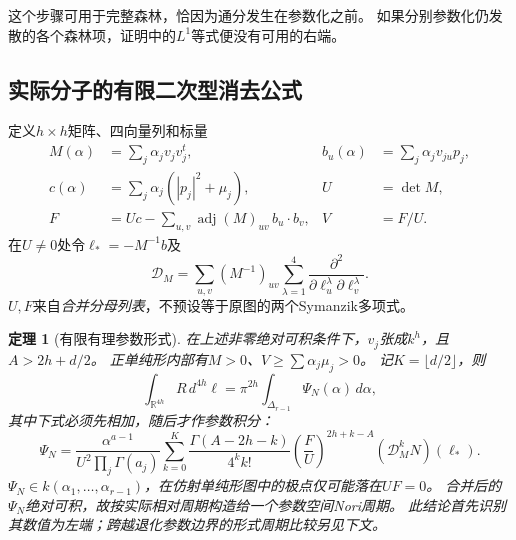 \documentclass[11pt,a4paper]{ctexart}
\theoremstyle{cnplain}\newtheorem{theorem}{定理}[section]
\theoremstyle{definition}\newtheorem{definition}[theorem]{定义}
\theoremstyle{remark}\newtheorem{remark}[theorem]{注}
\begin{document}
这个步骤可用于完整森林，恰因为通分发生在参数化之前。
如果分别参数化仍发散的各个森林项，证明中的$L^1$等式便没有可用的右端。

\subsection{实际分子的有限二次型消去公式}

定义$h\times h$矩阵、四向量列和标量
\begin{align}
 M(\alpha)&=\sum_j\alpha_j v_jv_j^t,&
 b_u(\alpha)&=\sum_j\alpha_jv_{ju}p_j,\nonumber\\
 c(\alpha)&=\sum_j\alpha_j(|p_j|^2+\mu_j),&
 U&=\det M,\nonumber\\
 F&=Uc-\sum_{u,v}\operatorname{adj}(M)_{uv}\,b_u\cdot b_v,&
 V&=F/U.\label{eq:forestaugmentedUF}
\end{align}
在$U\ne0$处令$\ell_*=-M^{-1}b$及
\[
 \mathcal D_M=\sum_{u,v}(M^{-1})_{uv}
 \sum_{\lambda=1}^4\frac{\partial^2}
 {\partial\ell_u^\lambda\partial\ell_v^\lambda}.
\]
$U,F$来自\emph{合并分母列表}，不预设等于原图的两个Symanzik多项式。

\begin{theorem}[有限有理参数形式]
\label{thm:forestmoments}
在上述非零绝对可积条件下，$v_j$张成$k^h$，且$A>2h+d/2$。
正单纯形内部有$M>0$、$V\geq\sum\alpha_j\mu_j>0$。
记$K=\lfloor d/2\rfloor$，则
\begin{equation}
 \int_{\mathbb R^{4h}}R\,d^{4h}\ell
 =\pi^{2h}\int_{\Delta_{r-1}}\Psi_N(\alpha)\,d\alpha,
 \label{eq:forestparametricfinal}
\end{equation}
其中下式必须先相加，随后才作参数积分：
\begin{equation}
 \Psi_N=
 \frac{\alpha^{a-1}}{U^2\prod_j\Gamma(a_j)}
 \sum_{k=0}^{K}
 \frac{\Gamma(A-2h-k)}{4^k k!}
 \left(\frac FU\right)^{2h+k-A}
 (\mathcal D_M^kN)(\ell_*).
 \label{eq:forestmomentformula}
\end{equation}
$\Psi_N\in k(\alpha_1,\ldots,\alpha_{r-1})$，在仿射单纯形图中的极点仅可能落在$UF=0$。
合并后的$\Psi_N$绝对可积，故按实际相对周期构造给一个参数空间Nori周期。
此结论首先识别其\emph{数值}为左端；跨越退化参数边界的形式周期比较另见下文。
\end{theorem}
\end{document}
